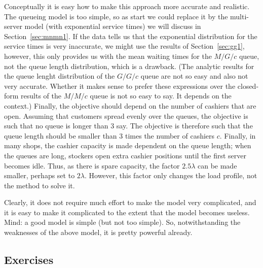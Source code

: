 Conceptually it is easy how to make this approach more accurate and
realistic. The queueing model is too simple, so as start we could
replace it by the multi-server model (with exponential service times)
we will discuss in Section~\ref{sec:mnmn1}. If the data tells us that
the exponential distribution for the service times is very inaccurate,
we might use the results of Section~\ref{sec:gg1}, however, this only
provides us with the mean waiting times for the $M/G/c$ queue, not the
queue length distribution, which is a drawback. (The analytic results
for the queue lenght distribution of the $G/G/c$ queue are not so easy
and also not very accurate. Whether it makes sense to prefer these
expressions over the closed-form results of the $M/M/c$ queue is not
so easy to say. It depends on the context.) Finally, the objective
should depend on the number of cashiers that are open. Assuming that
customers spread evenly over the queues, the objective is such that no
queue is longer than 3 say. The objective is therefore such that the
queue length should be smaller than $3$ times the number of cashiers
$c$. Finally, in many shops, the cashier capacity is made dependent on
the queue length; when the queues are long, stockers open extra
cashier positions until the first server becomes idle. Thus, as there
is spare capacity, the factor $2.5 \lambda$ can be made smaller,
perhaps set to $2\lambda$. However, this factor only changes the load
profile, not the method to solve it.

Clearly, it does not require much effort to make the model very
complicated, and it is easy to make it complicated to the extent that
the model becomes useless. Mind: a good model is simple (but not too
simple). So, notwithstanding the weaknesses of the above model, it is
pretty powerful already. 

\subsection*{Exercises}
\label{sec:exercises}


